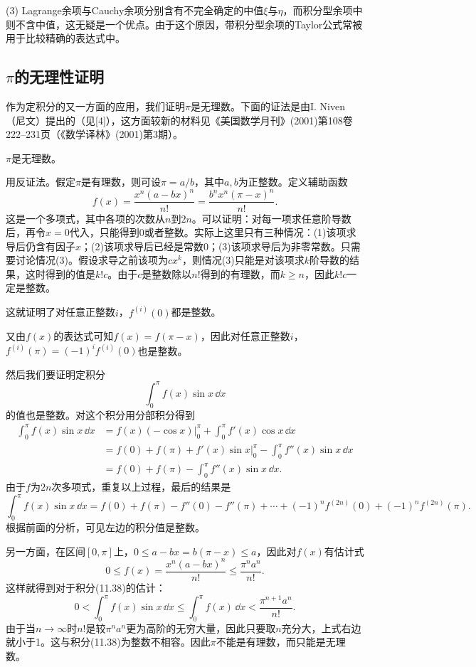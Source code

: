 (3) Lagrange余项与Cauchy余项分别含有不完全确定的中值$\xi$与$\eta$，而积分型余项中则不含中值，这无疑是一个优点。由于这个原因，带积分型余项的Taylor公式常被用于比较精确的表达式中。

\subsection{\texorpdfstring{$\pi$的无理性证明}{π的无理性证明}}

作为定积分的又一方面的应用，我们证明$\pi$是无理数。下面的证法是由I. Niven（尼文）提出的（见[4]），这方面较新的材料见《美国数学月刊》(2001)第108卷222--231页（《数学译林》(2001)第3期）。

\begin{xproposition}[11.4.4]
$\pi$是无理数。
\end{xproposition}
\begin{xproof}
用反证法。假定$\pi$是有理数，则可设$\pi=a/b$，其中$a,b$为正整数。定义辅助函数
\[
  f(x)=\frac{x^n(a-bx)^n}{n!}=\frac{b^nx^n(\pi-x)^n}{n!}.
\]
这是一个多项式，其中各项的次数从$n$到$2n$。可以证明：对每一项求任意阶导数后，再令$x=0$代入，只能得到0或者整数。实际上这里只有三种情况：(1)该项求导后仍含有因子$x$；(2)该项求导后已经是常数0；(3)该项求导后为非零常数。只需要讨论情况(3)。假设求导之前该项为$cx^k$，则情况(3)只能是对该项求$k$阶导数的结果，这时得到的值是$k!c$。由于$c$是整数除以$n!$得到的有理数，而$k\ge n$，因此$k!c$一定是整数。

这就证明了对任意正整数$i$，$f^{(i)}(0)$都是整数。

又由$f(x)$的表达式可知$f(x)=f(\pi-x)$，因此对任意正整数$i$，$f^{(i)}(\pi)=(-1)^if^{(i)}(0)$也是整数。

然后我们要证明定积分
\begin{equation}
  \int_0^\pi f(x)\sin x\,\dd x
  \tag{11.38}
  \label{eq:11.38}
\end{equation}
的值也是整数。对这个积分用分部积分得到
\begin{align*}
\int_0^\pi f(x)\sin x\,\dd x
&=f(x)(-\cos x)\Big|_0^\pi+\int_0^\pi f'(x)\cos x\,\dd x\\
&=f(0)+f(\pi)+f'(x)\sin x\Big|_0^\pi-\int_0^\pi f''(x)\sin x\,\dd x\\
&=f(0)+f(\pi)-\int_0^\pi f''(x)\sin x\,\dd x.
\end{align*}
由于$f$为$2n$次多项式，重复以上过程，最后的结果是
\[
  \int_0^\pi f(x)\sin x\,\dd x
  =f(0)+f(\pi)-f''(0)-f''(\pi)+\cdots
  +(-1)^nf^{(2n)}(0)+(-1)^nf^{(2n)}(\pi).
\]
根据前面的分析，可见左边的积分值是整数。

另一方面，在区间$[0,\pi]$上，$0\le a-bx=b(\pi-x)\le a$，因此对$f(x)$有估计式
\[
  0\le f(x)=\frac{x^n(a-bx)^n}{n!}\le\frac{\pi^na^n}{n!}.
\]
这样就得到对于积分(11.38)的估计：
\[
  0<\int_0^\pi f(x)\sin x\,\dd x
  \le\int_0^\pi f(x)\,\dd x
  <\frac{\pi^{n+1}a^n}{n!}.
\]
由于当$n\to\infty$时$n!$是较$\pi^na^n$更为高阶的无穷大量，因此只要取$n$充分大，上式右边就小于1。这与积分(11.38)为整数不相容。因此$\pi$不能是有理数，而只能是无理数。
\end{xproof}

